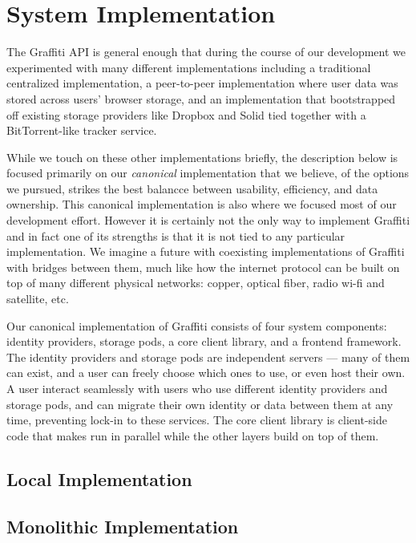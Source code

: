 \section{System Implementation}

The Graffiti API is general enough that during the course of our development
we experimented with many different implementations including
a traditional centralized implementation, a peer-to-peer implementation where user
data was stored across users' browser storage, and an implementation that
bootstrapped off existing storage providers like Dropbox and Solid
tied together with a BitTorrent-like tracker service.

While we touch on these other implementations briefly,
the description below is focused primarily on our \emph{canonical} implementation
that we believe, of the options we pursued, strikes
the best balancce between usability, efficiency, and data ownership.
This canonical implementation is also where we focused most of our development effort.
However it is certainly not the only way to implement Graffiti and
in fact one of its strengths is that it is not tied to any particular
implementation.
We imagine a future with coexisting implementations
of Graffiti with bridges between them, much like how the internet protocol
can be built on top of many different physical networks:
copper, optical fiber, radio wi-fi and satellite, etc.

Our canonical implementation of Graffiti consists of four system components:
identity providers, storage pods, a core client library, and a frontend framework.
The identity providers and storage pods are independent servers
--- many of them can exist, and a user can freely choose which ones to use, or even host their own.
A user interact seamlessly with users who use different identity providers and storage pods,
and can migrate their own identity or data between them at any time, preventing lock-in to these services.
The core client library is client-side code that makes
run in parallel while the other
layers build on top of them.

\subsection{Local Implementation}

\subsection{Monolithic Implementation}

